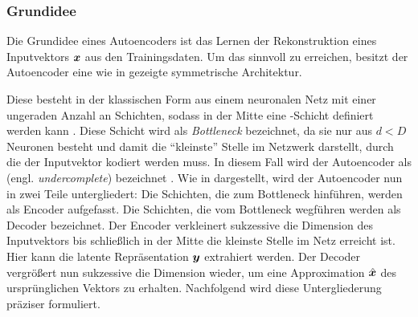 \subsubsection{Grundidee}
Die Grundidee eines Autoencoders ist das Lernen der Rekonstruktion eines Inputvektors $\bm{x}$
aus den Trainingsdaten. Um das sinnvoll zu erreichen, besitzt der Autoencoder eine wie in
 gezeigte symmetrische Architektur.


Diese besteht in der klassischen Form aus einem neuronalen Netz mit einer ungeraden Anzahl an
Schichten, sodass in der Mitte eine -Schicht definiert werden kann \parencite[2]{Bank.2020}. Diese Schicht wird als \textit{Bottleneck} bezeichnet, da sie nur aus $d < D$
Neuronen besteht und damit die \enquote{kleinste} Stelle im Netzwerk darstellt, durch die der
Inputvektor kodiert werden muss. In diesem Fall wird der Autoencoder als 
(engl. \textit{undercomplete}) bezeichnet \parencite[503]{Goodfellow.2016}. Wie in  dargestellt, wird der
Autoencoder nun in zwei Teile untergliedert: Die Schichten, die zum Bottleneck hinführen, werden
als Encoder aufgefasst. Die Schichten, die vom Bottleneck wegführen werden als Decoder bezeichnet.
Der Encoder verkleinert sukzessive die Dimension des Inputvektors bis schließlich in der Mitte die
kleinste Stelle im Netz erreicht ist. Hier kann die latente Repräsentation $\bm{y}$ extrahiert
werden. Der Decoder vergrößert nun sukzessive die Dimension wieder, um eine Approximation
$\hat{\bm{x}}$ des ursprünglichen Vektors zu erhalten. Nachfolgend wird diese
Untergliederung präziser formuliert.

